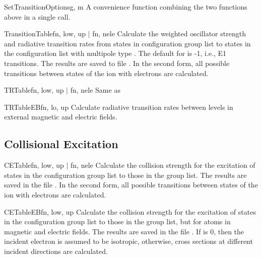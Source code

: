\begin{fundesc}{SetTransitionOptions}{g, m}
A convenience function combining the two functions above in a single call.
\end{fundesc}

\begin{fundesc}{TransitionTable}{fn, low, up $\mid$ fn, nele }
Calculate the weighted oscillator strength and radiative transition rates from
states in configuration group list  to states in the configuration list
 with multipole type . The default for  is -1, i.e., E1
transitions. The results are saved to file . In the second form, all
possible transitions between states of the ion with  electrons are
calculated.
\end{fundesc}

\begin{fundesc}{TRTable}{fn, low, up $\mid$ fn, nele }
Same as 
\end{fundesc}

\begin{fundesc}{TRTableEB}{fn, lo, up}
Calculate radiative transition rates between levels in external magnetic and
electric fields.
\end{fundesc}


\subsection{Collisional Excitation}

\begin{fundesc}{CETable}{fn, low, up $\mid$ fn, nele}
Calculate the collision strength for the excitation of states in the
configuration group list  to those in the group list. The
results are saved in the file . In the second form, all possible
transitions between states of the ion with  electrons are calculated.
\end{fundesc}

\begin{fundesc}{CETableEB}{fn, low, up}
Calculate the collision strength for the excitation of states in the
configuration group list  to those in the group list, but for
atoms in magnetic and electric fields. The
results are saved in the file . If  is 0, then the incident
electron is assumed to be isotropic, otherwise, cross sections at different
incident directions are calculated.
\end{fundesc}

